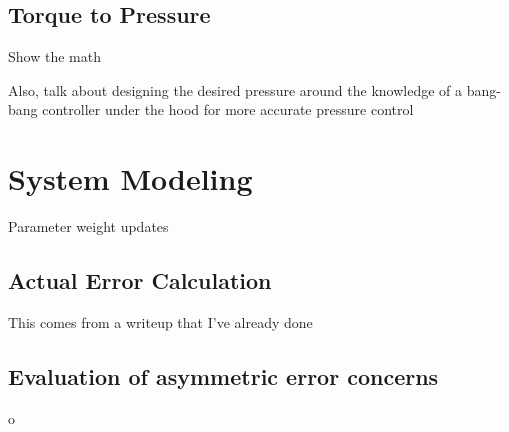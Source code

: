 
\subsection{Torque to Pressure}

Show the math

Also, talk about designing the desired pressure around the knowledge of a
bang-bang controller under the hood for more accurate pressure control

\section{System Modeling}

Parameter weight updates

\subsection{Actual Error Calculation}

This comes from a writeup that I've already done

\subsection{Evaluation of asymmetric error concerns}o

